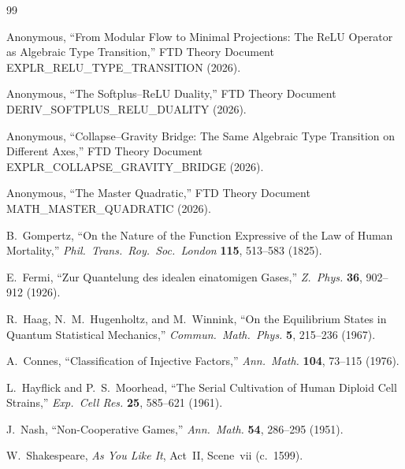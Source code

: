 \documentclass[12pt, letterpaper]{article}
\theoremstyle{plain}
\theoremstyle{definition}
\theoremstyle{remark}
\begin{document}
\begin{thebibliography}{99}

  Anonymous,
  ``From Modular Flow to Minimal Projections: The ReLU Operator as Algebraic Type Transition,''
  FTD Theory Document EXPLR\_RELU\_TYPE\_TRANSITION (2026).

  Anonymous,
  ``The Softplus--ReLU Duality,''
  FTD Theory Document DERIV\_SOFTPLUS\_RELU\_DUALITY (2026).

  Anonymous,
  ``Collapse--Gravity Bridge: The Same Algebraic Type Transition on Different Axes,''
  FTD Theory Document EXPLR\_COLLAPSE\_GRAVITY\_BRIDGE (2026).

  Anonymous,
  ``The Master Quadratic,''
  FTD Theory Document MATH\_MASTER\_QUADRATIC (2026).

  B.~Gompertz,
  ``On the Nature of the Function Expressive of the Law of Human Mortality,''
  \textit{Phil.\ Trans.\ Roy.\ Soc.\ London} \textbf{115}, 513--583 (1825).

  E.~Fermi,
  ``Zur Quantelung des idealen einatomigen Gases,''
  \textit{Z.\ Phys.} \textbf{36}, 902--912 (1926).

  R.~Haag, N.~M.~Hugenholtz, and M.~Winnink,
  ``On the Equilibrium States in Quantum Statistical Mechanics,''
  \textit{Commun.\ Math.\ Phys.} \textbf{5}, 215--236 (1967).

  A.~Connes,
  ``Classification of Injective Factors,''
  \textit{Ann.\ Math.} \textbf{104}, 73--115 (1976).

  L.~Hayflick and P.~S.~Moorhead,
  ``The Serial Cultivation of Human Diploid Cell Strains,''
  \textit{Exp.\ Cell Res.} \textbf{25}, 585--621 (1961).

  J.~Nash,
  ``Non-Cooperative Games,''
  \textit{Ann.\ Math.} \textbf{54}, 286--295 (1951).

  W.~Shakespeare,
  \textit{As You Like It}, Act~II, Scene~vii (c.~1599).

\end{thebibliography}
\end{document}
